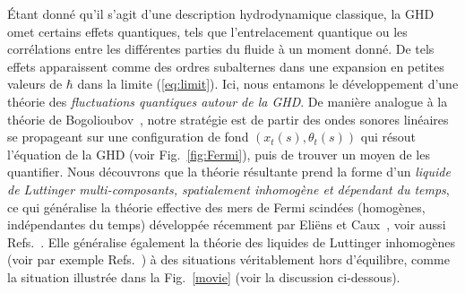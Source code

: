 \documentclass[twocolumn,amsfonts,showpacs,superscriptaddress]{revtex4-1}
\newcommand{\trad}[1]{\textcolor{myblue}{#1}}
\begin{document}
\trad{\vspace{0.1cm} \noindent {\bf\em Objectif de cette lettre.}\; Étant donné qu'il s'agit d'une description hydrodynamique classique, la GHD omet certains effets quantiques, tels que l'entrelacement quantique ou les corrélations entre les différentes parties du fluide à un moment donné. De tels effets apparaissent comme des ordres subalternes dans une expansion en petites valeurs de \( \hbar \) dans la limite (\ref{eq:limit}). Ici, nous entamons le développement d'une théorie des {\it fluctuations quantiques autour de la GHD}. De manière analogue à la théorie de Bogolioubov~\cite{bogolyubov1947theory,pitaevskii2016bose,mora2003extension}, notre stratégie est de partir des ondes sonores linéaires se propageant sur une configuration de fond $(x_t(s), \theta_t(s))$ qui résout l'équation de la GHD (voir Fig.~\ref{fig:Fermi}), puis de trouver un moyen de les quantifier. Nous découvrons que la théorie résultante prend la forme d'un {\it liquide de Luttinger multi-composants, spatialement inhomogène et dépendant du temps}, ce qui généralise la théorie effective des mers de Fermi scindées (homogènes, indépendantes du temps) développée récemment par Eli\"ens et Caux~\cite{eliens2016general}, voir aussi Refs.~\cite{fokkema2014split,vlijm2016correlations,eliens2017quantum}. Elle généralise également la théorie des liquides de Luttinger inhomogènes (voir par exemple Refs.~\cite{gangardt2003stability,abanov2006hydrodynamics,dubail2017conformal,brun2017one,brun2018inhomogeneous,ruggiero2019conformal,cazalilla2004bosonizing}) à des situations véritablement hors d'équilibre, comme la situation illustrée dans la Fig.~\ref{movie} (voir la discussion ci-dessous).}


\end{document}
